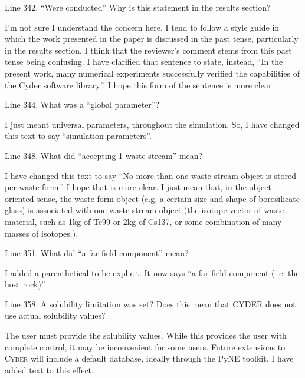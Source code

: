\documentclass[answers,12pt]{exam}
\newcommand{\Cyder}{\textsc{Cyder}\xspace}%
\begin{document}
\begin{questions}
 

\question Line 342. ``Were conducted'' Why is this statement in the results section?
\begin{solution}
I'm not sure I understand the concern here. I tend to follow a style guide in 
        which the work presented in the paper is discussed in the past tense, 
        particularly in the results section. I think that the reviewer's 
        comment stems from this past tense being confusing. I have clarified 
        that sentence to state, instead, ``In the present work, many numerical 
        experiments successfully verified the capabilities of the Cyder 
        software library''. I hope this form of the sentence is more clear.
\end{solution}

 

\question Line 344. What was a ``global parameter''?
\begin{solution}
I just meant universal parameters, throughout the simulation. So, I have 
        changed this text to say ``simulation parameters''.
\end{solution}

 

\question Line 348. What did ``accepting 1 waste stream'' mean?
\begin{solution}
        I have changed this text to say ``No more than one waste stream object 
        is stored per waste form.'' I hope that is more clear. I just mean 
        that, in the object oriented sense, the waste form object (e.g. a 
        certain size and shape of borosilicate glass) is associated with one 
        waste stream object (the isotope vector of waste material, such as 1kg 
        of Tc99 or 2kg of Cs137, or some combination of many masses of 
        isotopes.).
\end{solution}

 

\question Line 351. What did ``a far field component'' mean?
\begin{solution}
I added a parenthetical to be explicit. It now says ``a far field component 
        (i.e. the host rock)''.
\end{solution}

 

\question Line 358. A solubility limitation was set? Does this mean that CYDER does not use actual solubility values?
\begin{solution}
The user must provide the solubility values. While this provides the user with 
        complete control, it may be inconvenient for some users. Future extensions to \Cyder will 
        include a default database, ideally through the PyNE toolkit. I have 
        added text to this effect.
\end{solution}


\end{questions}
\end{document}

